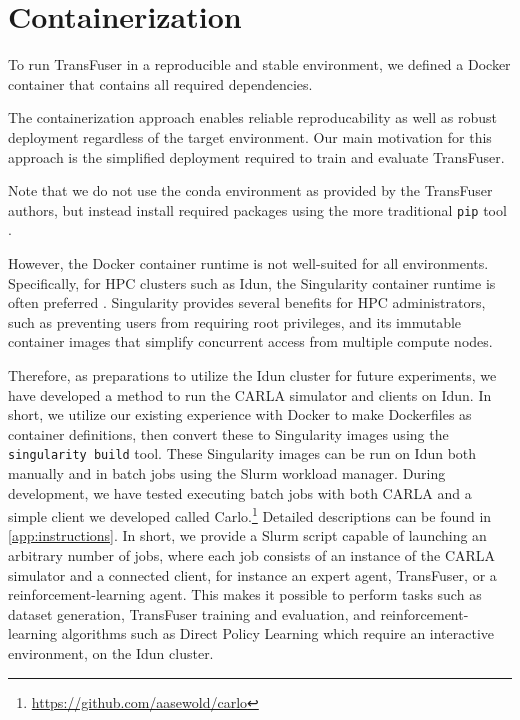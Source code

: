 \section{Containerization}
\label{sec:containerization}

To run TransFuser in a reproducible and stable environment,
we defined a Docker container \cite{software:docker}
that contains all required dependencies.

The containerization approach enables reliable reproducability
as well as robust deployment regardless of the target environment.
Our main motivation for this approach is the simplified deployment
required to train and evaluate TransFuser.

Note that we do not use the conda \cite{software:conda} environment
as provided by the TransFuser authors,
but instead install required packages
using the more traditional \texttt{pip} tool \cite{software:pip}.

However, the Docker container runtime is not well-suited for all environments.
Specifically, for HPC clusters such as Idun,
the Singularity container runtime \cite{software:singularity} is often preferred \cite{princeton:singularity}.
Singularity provides several benefits for HPC administrators,
such as preventing users from requiring root privileges, 
and its immutable container images that simplify concurrent access from multiple compute nodes. 

Therefore, as preparations to utilize the Idun cluster for future experiments,
we have developed a method to run the CARLA simulator and clients on Idun.
In short, we utilize our existing experience with Docker to make
Dockerfiles as container definitions,
then convert these to Singularity images using the
\texttt{singularity build} tool.
These Singularity images can be run on Idun
both manually and in batch jobs using the Slurm workload manager.
During development,
we have tested executing batch jobs with both CARLA and a simple client we developed called Carlo.\footnote{\url{https://github.com/aasewold/carlo}}
Detailed descriptions can be found in \autoref{app:instructions}.
In short,
we provide a Slurm script capable of launching
an arbitrary number of jobs,
where each job consists of an instance of the CARLA simulator and a connected client,
for instance an expert agent, TransFuser, or a reinforcement-learning agent.
This makes it possible to perform tasks such as
dataset generation,
TransFuser training and evaluation,
and reinforcement-learning algorithms such as Direct Policy Learning which require an interactive environment,
on the Idun cluster.
